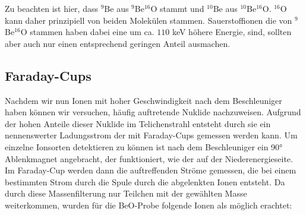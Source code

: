 Zu beachten ist hier, dass $^9$Be aus $^{9}$Be$^{16}$O stammt und $^{10}$Be aus $^{10}$Be$^{16}$O.
$^{16}$O kann daher prinzipiell von beiden Molekülen stammen.
Sauerstoffionen die von $^{9}$Be$^{16}$O stammen haben dabei eine um ca. $110$ keV höhere Energie, sind, sollten aber auch nur einen entsprechend geringen Anteil ausmachen.

\subsection{Faraday-Cups}
Nachdem wir nun Ionen mit hoher Geschwindigkeit nach dem Beschleuniger haben können wir versuchen, häufig auftretende Nuklide nachzuweisen.
Aufgrund der hohen Anteile dieser Nuklide im Telichenstrahl entsteht durch sie ein nennenswerter Ladungsstrom der mit Faraday-Cups gemessen werden kann.
Um einzelne Ionsorten detektieren zu können ist nach dem Beschleuniger ein \ang{90} Ablenkmagnet angebracht, der funktioniert, wie der auf der Niederenergieseite.
Im Faraday-Cup werden dann die auftreffenden Ströme gemessen, die bei einem bestimmten Strom durch die Spule durch die abgelenkten Ionen entsteht.
Da durch diese Massenfilterung nur Teilchen mit der gewählten Masse weiterkommen, wurden für die BeO-Probe folgende Ionen als möglich erachtet:
